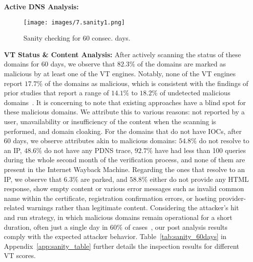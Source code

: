 {\bf Active DNS Analysis:}

\begin{figure}[t]
\centering
\texttt{[image: images/7.sanity1.png]}
\caption{Sanity checking for 60 consec. days. }
\label{fig:sanity1}
\end{figure}

{\bf VT Status \& Content Analysis:}
After actively scanning the status of these domains for 60 days, we observe that $82.3\%$ of the domains are marked as malicious by at least one of the VT engines. Notably, none of the VT engines report $17.7\%$ of the domains as malicious, which is consistent with the findings of prior studies that report a range of $14.1\%$ to $18.2\%$ of undetected malicious domains~\cite{vissers:euric:2019, vissers:30day:2017}. It is concerning to note that existing approaches have a blind spot for these malicious domains. We attribute this to various reasons: not reported by a user, unavailability or insufficiency of the content when the scanning is performed, and domain cloaking. 
For the domains that do not have IOCs, after 60 days, we observe attributes akin to malicious domains: $54.8\%$ do not resolve to an IP, $48.6\%$ do not have any PDNS trace, $92.7\%$ have had less than 100 queries during the whole second month of the verification process, and none of them are present in the Internet Wayback Machine.
Regarding the ones that resolve to an IP, we observe that $6.3\%$ are parked, and $58.8\%$ either do not provide any HTML response, show empty content or various error messages such as invalid common name within the certificate, registration confirmation errors, or hosting provider-related warnings rather than legitimate content. 
Considering the attacker's hit and run strategy, in which malicious domains remain operational for a short duration, often just a single day in $60\%$ of cases~\cite{hao:30day:2013, oest:sunrise:usenix:2020}, our post analysis results comply with the expected attacker behavior.
Table~\ref{tab:sanity_60days} in Appendix~\ref{app:sanity_table} further details the inspection results for different VT scores.

